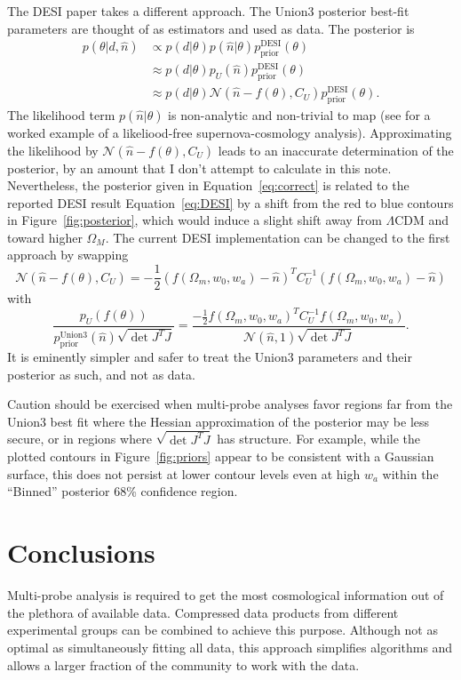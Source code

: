 \documentclass[11pt,a4paper]{article}
\begin{document}
The DESI paper takes a different approach.  The Union3 posterior best-fit parameters are thought of as estimators and used as
 data.  The posterior is
\begin{align}
p(\theta | d, \hat{n}) & \propto p(d| \theta) p( \hat{n}| \theta) p^\text{DESI}_\text{prior}(\theta) \\
& \approx p(d| \theta) p_U(\hat{n})  p^\text{DESI}_\text{prior}(\theta)  \\
& \approx p(d| \theta) \mathcal{N}( \hat{n}-f(\theta) , C_U)  p^\text{DESI}_\text{prior}(\theta) \label{eq:DESI}.
\end{align}
The  likelihood
 term $ p( \hat{n}| \theta)$ is non-analytic and non-trivial to map
(see \cite{2013ApJ...764..116W} for a worked example of a likeliood-free supernova-cosmology analysis).
Approximating the likelihood
by $\mathcal{N}( \hat{n}-f(\theta) , C_U)$ leads to an inaccurate determination
of the posterior, by an amount that I don't attempt to calculate in this note.
Nevertheless, the posterior given in Equation~\ref{eq:correct} is related to the reported DESI result Equation~\ref{eq:DESI}
by a shift from the red to blue contours in Figure~\ref{fig:posterior}, which would induce a slight shift away from $\Lambda$CDM
and toward higher $\Omega_M$.
The current DESI implementation can be changed to the first approach by swapping
\begin{equation}
 \mathcal{N}( \hat{n}-f(\theta) , C_U) = -\frac{1}{2} (f(\Omega_m, w_0, w_a) - \hat{n})^T C_U^{-1} (f(\Omega_m, w_0, w_a) - \hat{n})
\end{equation}
with
\begin{equation}
 \frac{p_U(f(\theta))} {p^\text{Union3}_\text{prior}(\hat{n}) \sqrt{\det{J^TJ}}} =\frac{ -\frac{1}{2} f(\Omega_m, w_0, w_a) ^T C_U^{-1}  f(\Omega_m, w_0, w_a) }
 {\mathcal{N}(\hat{n},1) \sqrt{\det{J^TJ}}}.
\end{equation}
It is eminently simpler and safer to treat the Union3 parameters and their posterior as such, and not as data.


Caution should be exercised when multi-probe analyses favor regions far from the Union3 best fit  where the Hessian approximation of the
posterior may be less secure, or in regions where $\sqrt{\det{J^TJ}}$ has structure.  For example, while the plotted contours in Figure~\ref{fig:priors}
appear to be consistent with a Gaussian surface, this does not persist at lower contour levels even at high $w_a$ within the ``Binned'' posterior 68\% confidence region.

\section{Conclusions}
\label{sec:conclusions}
Multi-probe  analysis is required to get the most cosmological information out of the plethora of available data. 
Compressed data products from different experimental groups can be combined to achieve this purpose.
Although not as optimal as simultaneously fitting all data, this approach simplifies algorithms and allows a larger
fraction of
the community to work with the data.
\end{document}
